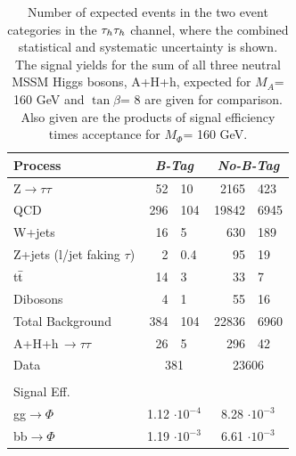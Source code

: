 \clearpage

\vspace*{-0.2cm}
\begin{table}[!h]
  \begin{center}
    \caption{Number of expected events in the two event categories in the $\mathrm{\tau}_{h}\mathrm{\tau}_{h}$ channel, where the combined statistical and systematic uncertainty is shown. 
      The signal yields for the sum of all three neutral MSSM Higgs bosons, A+H+h, expected for $M_{A}$= 160 GeV and $\tan\beta$= 8 are given for comparison.
      Also given are the products of signal efficiency times acceptance for $M_{\Phi}$= 160 GeV.}
\begin{tabular}{|l|r@{$ \,\,\pm\,\, $}l|r@{$ \,\,\pm\,\, $}l|} 
\hline 
Process & \multicolumn{2}{c|}{\emph{B-Tag}} & \multicolumn{2}{c|}{\emph{No-B-Tag}}\\ 
\hline 
Z$\rightarrow \tau\tau$          &       52      &       10      &       2165    &       423     \\ 
\hline 
QCD                              &       296     &       104     &       19842   &       6945    \\ 
\hline 
W+jets                           &       16      &       5       &       630     &       189     \\ 
\hline 
Z+jets (l/jet faking $\tau$)     &       2       &       0.4     &       95      &       19      \\ 
\hline 
t$\bar{\rm{t}}$                  &       14      &       3       &       33      &       7       \\ 
\hline 
Dibosons                         &       4       &       1       &       55      &       16      \\ 
\hline 
\hline 
Total Background                 &       384     &       104     &       22836   &       6960    \\ 
\hline 
A+H+h\,$\rightarrow\tau\tau$       &       26      &       5     &       296     &       42       \\ 
\hline 
Data                             & \multicolumn{2}{|c|}{381}     & \multicolumn{2}{|c|}{23606}   \\ 
\hline 
\multicolumn{5}{c}{ } \\
\multicolumn{2}{l}{Signal Eff.} &  \multicolumn{3}{c}{ } \\
\hline
gg$\rightarrow\Phi$                &       \multicolumn{2}{|c|}{1.12 $\cdot 10^{-4}$}      &       \multicolumn{2}{|c|}{8.28 $\cdot 10^{-3}$}\\ 
\hline 
bb$\rightarrow\Phi$                &       \multicolumn{2}{|c|}{1.19 $\cdot 10^{-3}$}      &       \multicolumn{2}{|c|}{6.61 $\cdot 10^{-3}$}\\ 
\hline 
\end{tabular} 
\label{table:events_tautau} 
\end{center} 
\end{table} 

